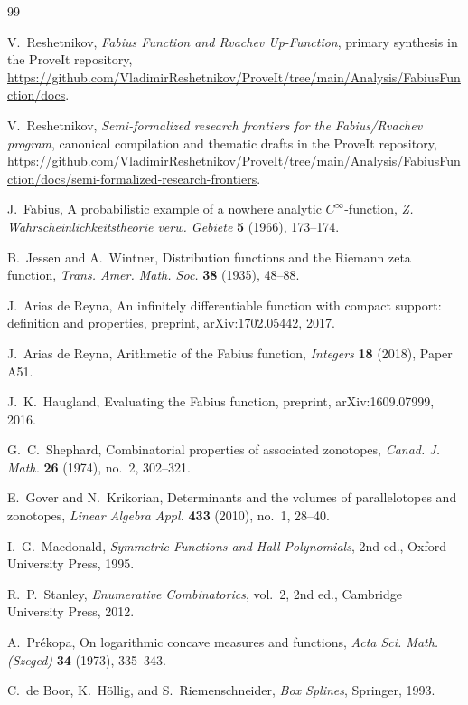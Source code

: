\documentclass[11pt,a4paper]{article}
\theoremstyle{definition}
\theoremstyle{remark}
\begin{document}
\begin{thebibliography}{99}

V.~Reshetnikov,
\emph{Fabius Function and Rvachev Up-Function},
primary synthesis in the ProveIt repository,
\url{https://github.com/VladimirReshetnikov/ProveIt/tree/main/Analysis/FabiusFunction/docs}.

V.~Reshetnikov,
\emph{Semi-formalized research frontiers for the Fabius/Rvachev program},
canonical compilation and thematic drafts in the ProveIt repository,
\url{https://github.com/VladimirReshetnikov/ProveIt/tree/main/Analysis/FabiusFunction/docs/semi-formalized-research-frontiers}.

J.~Fabius,
A probabilistic example of a nowhere analytic $C^\infty$-function,
\emph{Z. Wahrscheinlichkeitstheorie verw. Gebiete} \textbf{5} (1966), 173--174.

B.~Jessen and A.~Wintner,
Distribution functions and the Riemann zeta function,
\emph{Trans. Amer. Math. Soc.} \textbf{38} (1935), 48--88.

J.~Arias de Reyna,
An infinitely differentiable function with compact support: definition and properties,
preprint, arXiv:1702.05442, 2017.

J.~Arias de Reyna,
Arithmetic of the Fabius function,
\emph{Integers} \textbf{18} (2018), Paper A51.

J.~K.~Haugland,
Evaluating the Fabius function,
preprint, arXiv:1609.07999, 2016.

G.~C.~Shephard,
Combinatorial properties of associated zonotopes,
\emph{Canad. J. Math.} \textbf{26} (1974), no.~2, 302--321.

E.~Gover and N.~Krikorian,
Determinants and the volumes of parallelotopes and zonotopes,
\emph{Linear Algebra Appl.} \textbf{433} (2010), no.~1, 28--40.

I.~G.~Macdonald,
\emph{Symmetric Functions and Hall Polynomials}, 2nd ed.,
Oxford University Press, 1995.

R.~P.~Stanley,
\emph{Enumerative Combinatorics}, vol.~2, 2nd ed.,
Cambridge University Press, 2012.

A.~Pr\'ekopa,
On logarithmic concave measures and functions,
\emph{Acta Sci. Math. (Szeged)} \textbf{34} (1973), 335--343.

C.~de Boor, K.~H\"ollig, and S.~Riemenschneider,
\emph{Box Splines},
Springer, 1993.


\end{thebibliography}
\end{document}
